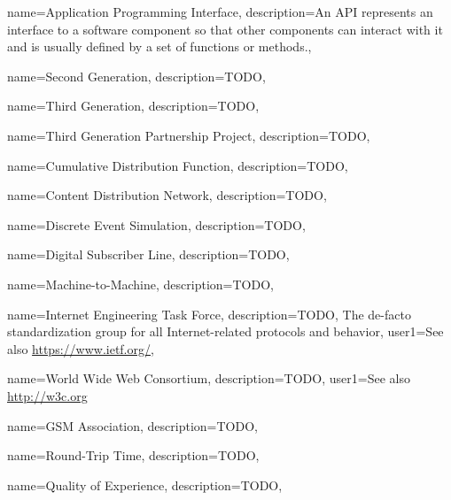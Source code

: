

{
  name=Application Programming Interface,
  description={An API represents an interface to a software component so that other components can interact with it and is usually defined by a set of functions or methods.},
}

{
  name=Second Generation,
  description={TODO},
}

{
  name=Third Generation,
  description={TODO},
}

{
  name=Third Generation Partnership Project,
  description={TODO},
}

{
  name=Cumulative Distribution Function,
  description={TODO},
}

{
  name=Content Distribution Network,
  description={TODO},
}

{
  name=Discrete Event Simulation,
  description={TODO},
}

{
  name=Digital Subscriber Line,
  description={TODO},
}

{
  name=Machine-to-Machine,
  description={TODO},
}

{
  name=Internet Engineering Task Force,
  description={TODO, The de-facto standardization group for all Internet-related protocols and behavior},
  user1={See also \url{https://www.ietf.org/}},
}


{
  name=World Wide Web Consortium,
  description={TODO},
  user1={See also \url{http://w3c.org}}
}

{
  name=\acrshort{GSM} Association,
  description={TODO},
}

{
  name=Round-Trip Time,
  description={TODO},
}

{
  name=Quality of Experience,
  description={TODO},
}

